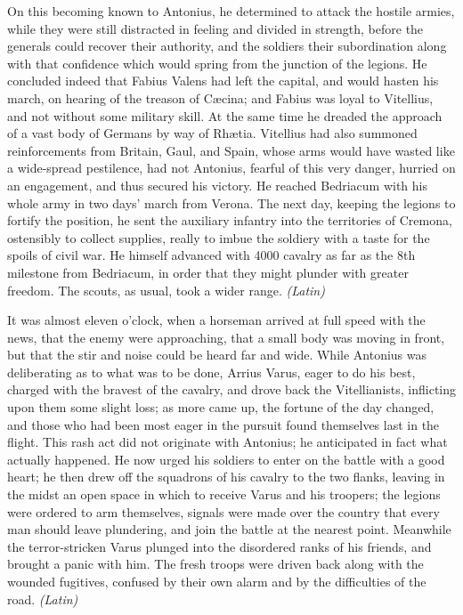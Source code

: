 
On this becoming known to Antonius, he determined to attack the hostile armies, while they were still distracted in feeling and divided in strength, before the generals could recover their authority, and the soldiers their subordination along with that confidence which would spring from the junction of the legions. He concluded indeed that Fabius Valens had left the capital, and would hasten his march, on hearing of the treason of Cæcina; and Fabius was loyal to Vitellius, and not without some military skill. At the same time he dreaded the approach of a vast body of Germans by way of Rhætia. Vitellius had also summoned reinforcements from Britain, Gaul, and Spain, whose arms would have wasted like a wide-spread pestilence, had not Antonius, fearful of this very danger, hurried on an engagement, and thus secured his victory. He reached Bedriacum with his whole army in two days' march from Verona. The next day, keeping the legions to fortify the position, he sent the auxiliary infantry into the territories of Cremona, ostensibly to collect supplies, really to imbue the soldiery with a taste for the spoils of civil war. He himself advanced with 4000 cavalry as far as the 8th milestone from Bedriacum, in order that they might plunder with greater freedom. The scouts, as usual, took a wider range. \emph{(Latin)}


It was almost eleven o'clock, when a horseman arrived at full speed with the news, that the enemy were approaching, that a small body was moving in front, but that the stir and noise could be heard far and wide. While Antonius was deliberating as to what was to be done, Arrius Varus, eager to do his best, charged with the bravest of the cavalry, and drove back the Vitellianists, inflicting upon them some slight loss; as more came up, the fortune of the day changed, and those who had been most eager in the pursuit found themselves last in the flight. This rash act did not originate with Antonius; he anticipated in fact what actually happened. He now urged his soldiers to enter on the battle with a good heart; he then drew off the squadrons of his cavalry to the two flanks, leaving in the midst an open space in which to receive Varus and his troopers; the legions were ordered to arm themselves, signals were made over the country that every man should leave plundering, and join the battle at the nearest point. Meanwhile the terror-stricken Varus plunged into the disordered ranks of his friends, and brought a panic with him. The fresh troops were driven back along with the wounded fugitives, confused by their own alarm and by the difficulties of the road. \emph{(Latin)}

